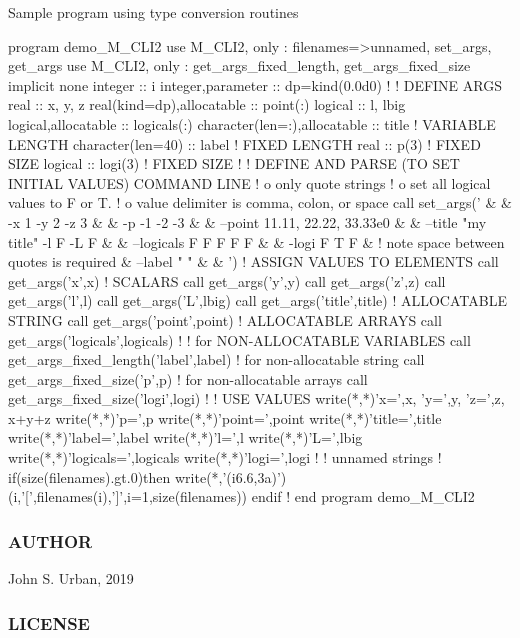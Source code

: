 Sample program using type conversion routines \begin{DoxyVerb}program demo_M_CLI2
use M_CLI2,  only : filenames=>unnamed, set_args, get_args
use M_CLI2,  only : get_args_fixed_length, get_args_fixed_size
implicit none
integer                      :: i
integer,parameter            :: dp=kind(0.0d0)
!
! DEFINE ARGS
real                         :: x, y, z
real(kind=dp),allocatable    :: point(:)
logical                      :: l, lbig
logical,allocatable          :: logicals(:)
character(len=:),allocatable :: title    ! VARIABLE LENGTH
character(len=40)            :: label    ! FIXED LENGTH
real                         :: p(3)     ! FIXED SIZE
logical                      :: logi(3)  ! FIXED SIZE
!
! DEFINE AND PARSE (TO SET INITIAL VALUES) COMMAND LINE
!   o only quote strings
!   o set all logical values to F or T.
!   o value delimiter is comma, colon, or space
call set_args('                         &
        & -x 1 -y 2 -z 3                &
        & -p -1 -2 -3                   &
        & --point 11.11, 22.22, 33.33e0 &
        & --title "my title" -l F -L F  &
        & --logicals  F F F F F         &
        & -logi F T F                   &
        ! note space between quotes is required
        & --label " " &
        & ')
! ASSIGN VALUES TO ELEMENTS
call get_args('x',x)         ! SCALARS
call get_args('y',y)
call get_args('z',z)
call get_args('l',l)
call get_args('L',lbig)
call get_args('title',title) ! ALLOCATABLE STRING
call get_args('point',point) ! ALLOCATABLE ARRAYS
call get_args('logicals',logicals)
!
! for NON-ALLOCATABLE VARIABLES
call get_args_fixed_length('label',label) ! for non-allocatable string
call get_args_fixed_size('p',p)           ! for non-allocatable arrays
call get_args_fixed_size('logi',logi)
!
! USE VALUES
write(*,*)'x=',x, 'y=',y, 'z=',z, x+y+z
write(*,*)'p=',p
write(*,*)'point=',point
write(*,*)'title=',title
write(*,*)'label=',label
write(*,*)'l=',l
write(*,*)'L=',lbig
write(*,*)'logicals=',logicals
write(*,*)'logi=',logi
!
! unnamed strings
!
if(size(filenames).gt.0)then
   write(*,'(i6.6,3a)')(i,'[',filenames(i),']',i=1,size(filenames))
endif
!
end program demo_M_CLI2
\end{DoxyVerb}


\subsubsection*{A\+U\+T\+H\+OR}

John S. Urban, 2019 \subsubsection*{L\+I\+C\+E\+N\+SE}

